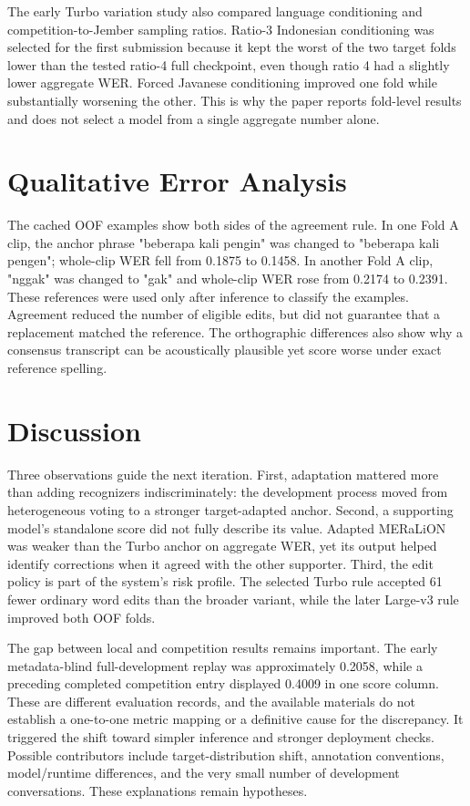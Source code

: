 \documentclass[journal]{IEEEtran}
\begin{document}
The early Turbo variation study also compared language conditioning and competition-to-Jember sampling ratios. Ratio-3 Indonesian conditioning was selected for the first submission because it kept the worst of the two target folds lower than the tested ratio-4 full checkpoint, even though ratio 4 had a slightly lower aggregate WER. Forced Javanese conditioning improved one fold while substantially worsening the other. This is why the paper reports fold-level results and does not select a model from a single aggregate number alone.

\section{Qualitative Error Analysis}
The cached OOF examples show both sides of the agreement rule. In one Fold A clip, the anchor phrase "beberapa kali pengin" was changed to "beberapa kali pengen"; whole-clip WER fell from 0.1875 to 0.1458. In another Fold A clip, "nggak" was changed to "gak" and whole-clip WER rose from 0.2174 to 0.2391. These references were used only after inference to classify the examples. Agreement reduced the number of eligible edits, but did not guarantee that a replacement matched the reference. The orthographic differences also show why a consensus transcript can be acoustically plausible yet score worse under exact reference spelling.

\section{Discussion}
Three observations guide the next iteration. First, adaptation mattered more than adding recognizers indiscriminately: the development process moved from heterogeneous voting to a stronger target-adapted anchor. Second, a supporting model's standalone score did not fully describe its value. Adapted MERaLiON was weaker than the Turbo anchor on aggregate WER, yet its output helped identify corrections when it agreed with the other supporter. Third, the edit policy is part of the system's risk profile. The selected Turbo rule accepted 61 fewer ordinary word edits than the broader variant, while the later Large-v3 rule improved both OOF folds.

The gap between local and competition results remains important. The early metadata-blind full-development replay was approximately 0.2058, while a preceding completed competition entry displayed 0.4009 in one score column. These are different evaluation records, and the available materials do not establish a one-to-one metric mapping or a definitive cause for the discrepancy. It triggered the shift toward simpler inference and stronger deployment checks. Possible contributors include target-distribution shift, annotation conventions, model/runtime differences, and the very small number of development conversations. These explanations remain hypotheses.
\end{document}
